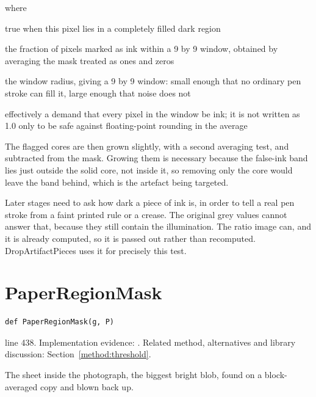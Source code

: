 \noindent where
\begin{description}[leftmargin=2.4em,style=nextline,font=\normalfont\ttfamily]\setlength\itemsep{1pt}
  \item[{$\mathrm{solid}[y,x]$}] \normalfont true when this pixel lies in a completely filled dark region
  \item[{$\mathrm{BoxMean}(\mathrm{mask},4)$}] \normalfont the fraction of pixels marked as ink within a 9 by 9 window, obtained by averaging the mask treated as ones and zeros
  \item[{$4$}] \normalfont the window radius, giving a 9 by 9 window: small enough that no ordinary pen stroke can fill it, large enough that noise does not
  \item[{$0.999$}] \normalfont effectively a demand that every pixel in the window be ink; it is not written as 1.0 only to be safe against floating-point rounding in the average
\end{description}
The flagged cores are then grown slightly, with a second averaging test, and subtracted from the mask. Growing them is necessary because the false-ink band lies just outside the solid core, not inside it, so removing only the core would leave the band behind, which is the artefact being targeted.


Later stages need to ask how dark a piece of ink is, in order to tell a real pen stroke from a faint printed rule or a crease. The original grey values cannot answer that, because they still contain the illumination. The ratio image can, and it is already computed, so it is passed out rather than recomputed. DropArtifactPieces uses it for precisely this test.



\section{PaperRegionMask}\label{fn:segment:PaperRegionMask}
\begin{lstlisting}[style=sig]
def PaperRegionMask(g, P)
\end{lstlisting}
 line 438. Implementation evidence: \cite{code2026}. Related method, alternatives and library discussion: Section~\ref{method:threshold}.


The sheet inside the photograph, the biggest bright blob, found on a block-averaged copy and blown back up.




